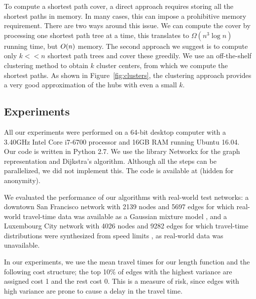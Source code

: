 \vspace{-0.5em}
\begin{remark}
To compute a shortest path cover, a direct approach requires storing all the shortest paths in memory.
In many cases, this can impose a prohibitive memory requirement.
There are two ways around this issue.
We can compute the cover by processing one shortest path tree at a time, this translates to $\Omega(n^3\log n)$ running time, but $O(n)$ memory.
The second approach we suggest is to compute only $k<<n$ shortest path trees and cover these greedily.
We use an off-the-shelf clustering method to obtain $k$ cluster centers, from which we compute the shortest paths. 
As shown in Figure~\ref{fig:clusters}, the clustering approach provides a very good approximation of the hubs with even a small $k$.
\end{remark}

\subsection{Experiments} 
\label{sec:exp}

All our experiments were performed on a 64-bit desktop computer with a 3.40GHz Intel Core i7-6700 processor and 16GB RAM running Ubuntu 16.04.
Our code is written in Python 2.7.
We use the library Networkx for the graph representation and Dijkstra's algorithm.
Although all the steps can be parallelized, we did not implement this.
The code is available at (hidden for anonymity).%

We evaluated the performance of our algorithms with real-world test networks: a downtown San Francisco network with 2139 nodes and 5697 edges for which real-world travel-time data was available as a Gaussian mixture model \cite{sf_data}, and a Luxembourg City network with 4026 nodes and 9282 edges for which travel-time distributions were synthesized from speed limits \cite{niknami2016tractable}, as real-world data was unavailable.
 
In our experiments, we use the mean travel times for our length function and the following cost structure; the top 10\% of edges with the highest variance are assigned cost 1 and the rest cost 0.
This is a measure of risk, since edges with high variance are prone to cause a delay in the travel time.


